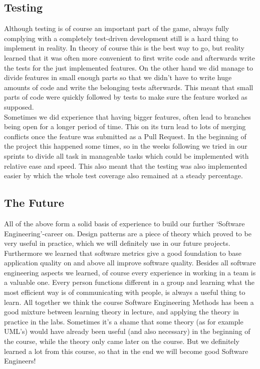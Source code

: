 \subsection{Testing}
Although testing is of course an important part of the game, always fully complying with a completely test-driven development still is a hard thing to implement in reality. In theory of course this is the best way to go, but reality learned that it was often more convenient to first write code and afterwards write the tests for the just implemented features. On the other hand we did manage to divide features in small enough parts so that we didn't have to write huge amounts of code and write the belonging tests afterwards. This meant that small parts of code were quickly followed by tests to make sure the feature worked as supposed. \\
Sometimes we did experience that having bigger features, often lead to branches being open for a longer period of time. This on its turn lead to lots of merging conflicts once the feature was submitted as a Pull Request. In the beginning of the project this happened some times, so in the weeks following we tried in our sprints to divide all task in manageable tasks which could be implemented with relative ease and speed. This also meant that the testing was also implemented easier by which the whole test coverage also remained at a steady percentage. 

\subsection{The Future}
All of the above form a solid basis of experience to build our further `Software Engineering'-career on. Design patterns are a piece of theory which proved to be very useful in practice, which we will definitely use in our future projects. Furthermore we learned that software metrics give a good foundation to base application quality on and above all improve software quality. Besides all software engineering aspects we learned, of course every experience in working in a team is a valuable one. Every person functions different in a group and learning what the most efficient way is of communicating with people, is always a useful thing to learn. All together we think the course Software Engineering Methods has been a good mixture between learning theory in lecture, and applying the theory in practice in the labs. Sometimes it's a shame that some theory (as for example UML's) would have already been useful (and also necessary) in the beginning of the course, while the theory only came later on the course. But we definitely learned a lot from this course, so that in the end we will become good Software Engineers! 

